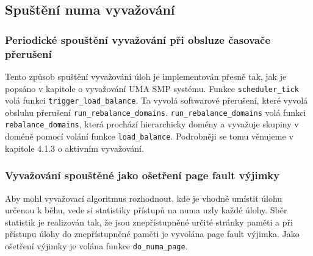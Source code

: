\documentclass[
  field=ainfk,
  biblatex,
  glossaries,
  index
]{kidiplom}
\begin{document}
\subsection{Spuštění numa vyvažování}

\subsubsection{Periodické spouštění vyvažování při obsluze časovače přerušení}
Tento způsob spuštění vyvažování úloh je implementován přesně tak, jak je popsáno v kapitole o vyvažování UMA SMP systému. Funkce \verb#scheduler_tick# volá funkci \verb#trigger_load_balance#. Ta vyvolá softwarové přerušení, které vyvolá obsluhu přerušení \verb#run_rebalance_domains#. \verb#run_rebalance_domains# volá funkci \verb#rebalance_domains#, která prochází hierarchicky domény a vyvažuje skupiny v doméně pomocí volání funkce \verb#load_balance#. Podrobněji se tomu věnujeme v kapitole 4.1.3 o aktivním vyvažování.

\subsubsection{Vyvažování spouštěné jako ošetření page fault výjimky}
\label{page fault}
Aby mohl vyvažovací algoritmus rozhodnout, kde je vhodné umístit úlohu určenou k běhu, vede si statistiky přístupů na numa uzly každé úlohy. Sběr statistik je realizován tak, že jsou znepřístupněné určité stránky paměti a při přístupu úlohy do znepřístupněné paměti je vyvolána page fault výjimka. Jako ošetření výjimky je volána funkce \verb#do_numa_page#. 
\end{document}
